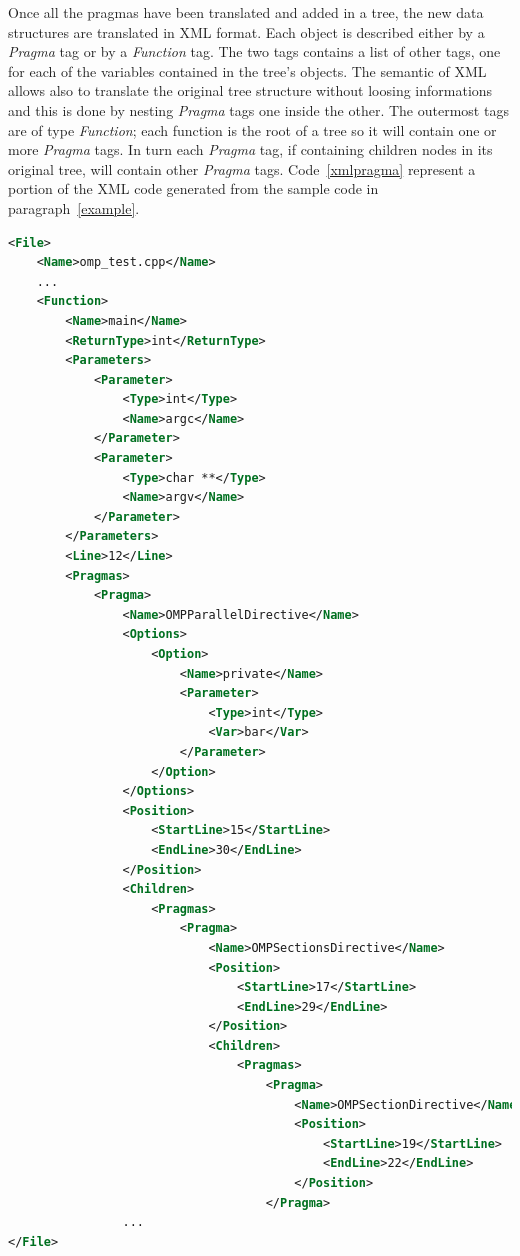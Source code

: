 \documentclass[a4paper,12pt,oneside]{book}
\begin{document}
Once all the pragmas have been translated and added in a tree, the new data structures are translated in XML format. Each object is described either by a \emph{Pragma} tag or by a \emph{Function} tag. The two tags contains a list of other tags, one for  each of the variables contained in the tree’s objects. The semantic of XML allows also to translate the original tree structure without loosing informations and this is done by nesting \emph{Pragma} tags one inside the other. The outermost tags are of type \emph{Function}; each function is the root of a tree so it will contain one or more \emph{Pragma} tags. In turn each \emph{Pragma} tag, if containing children nodes in its original tree, will contain other \emph{Pragma} tags. Code~\ref{xmlpragma} represent a portion of the XML code generated from the sample code in paragraph~\ref{example}.

\begin{lstlisting}[language=XML, caption=XML file of the pragma structure of Code~\ref{code}., label=xmlpragma]
<File>
    <Name>omp_test.cpp</Name>    
    ...
    <Function>
        <Name>main</Name>
        <ReturnType>int</ReturnType>
        <Parameters>
            <Parameter>
                <Type>int</Type>
                <Name>argc</Name>
            </Parameter>
            <Parameter>
                <Type>char **</Type>
                <Name>argv</Name>
            </Parameter>
        </Parameters>
        <Line>12</Line>
        <Pragmas>
            <Pragma>
                <Name>OMPParallelDirective</Name>
                <Options>
                    <Option>
                        <Name>private</Name>
                        <Parameter>
                            <Type>int</Type>
                            <Var>bar</Var>
                        </Parameter>
                    </Option>
                </Options>
                <Position>
                    <StartLine>15</StartLine>
                    <EndLine>30</EndLine>
                </Position>
                <Children>
                    <Pragmas>
                        <Pragma>
                            <Name>OMPSectionsDirective</Name>
                            <Position>
                                <StartLine>17</StartLine>
                                <EndLine>29</EndLine>
                            </Position>
                            <Children>
                                <Pragmas>
                                    <Pragma>
                                        <Name>OMPSectionDirective</Name>
                                        <Position>
                                            <StartLine>19</StartLine>
                                            <EndLine>22</EndLine>
                                        </Position>
                                    </Pragma>
				...
</File>
\end{lstlisting}
\end{document}
